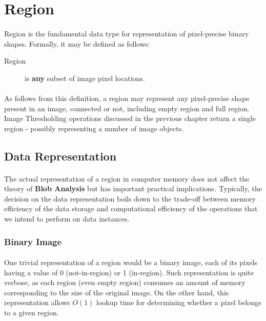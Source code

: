 
\section{Region}

\paragraph*{}
Region is the fundamental data type for representation of pixel-precise binary shapes. Formally, it may be defined as follows:

\begin{description}
	\item[Region] is \textbf{any} subset of image pixel locations.
\end{description}

\paragraph*{}
As follows from this definition, a region may represent any pixel-precise shape present in an image, connected or not, including empty region and full region. Image Thresholding operations discussed in the previous chapter return a single region - possibly representing a number of image objects.

\subsection{Data Representation}

\paragraph*{}
The actual representation of a region in computer memory does not affect the theory of \textbf{Blob Analysis} but has important practical implications. Typically, the decision on the data representation boils down to  the trade-off between memory efficiency of the data storage and computational efficiency of the operations that we intend to perform on data instances.

\subsubsection{Binary Image}

\paragraph*{}
One trivial representation of a region would be a binary image, each of its pixels having a value of 0 (not-in-region) or 1 (in-region). Such representation is quite verbose, as each region (even empty region) consumes an amount of memory corresponding to the size of the original image. On the other hand, this representation allows $O(1)$ lookup time for determining whether a pixel belongs to a given region.

